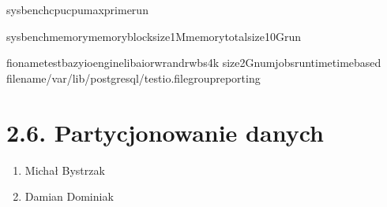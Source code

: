 \documentclass[a4paper,11pt,english,openany,oneside]{sphinxmanual}
\begin{document}
\begin{sphinxVerbatim}[commandchars=\\\{\}]
sysbenchcpu\PYGZhy{}\PYGZhy{}cpu\PYGZhy{}max\PYGZhy{}primerun

sysbenchmemory\PYGZhy{}\PYGZhy{}memory\PYGZhy{}block\PYGZhy{}size1M\PYGZhy{}\PYGZhy{}memory\PYGZhy{}total\PYGZhy{}size10Grun

fio\PYGZhy{}\PYGZhy{}nametest\PYGZus{}bazy\PYGZhy{}\PYGZhy{}ioenginelibaio\PYGZhy{}\PYGZhy{}rwrandrw\PYGZhy{}\PYGZhy{}bs4k
\PYGZhy{}\PYGZhy{}size2G\PYGZhy{}\PYGZhy{}numjobs\PYGZhy{}\PYGZhy{}runtime\PYGZhy{}\PYGZhy{}time\PYGZus{}based
\PYGZhy{}\PYGZhy{}filename/var/lib/postgresql/test\PYGZus{}io.file\PYGZhy{}\PYGZhy{}group\PYGZus{}reporting
\end{sphinxVerbatim}

\sphinxstepscope


\section{2.6. Partycjonowanie danych}
\label{\detokenize{rozdzial_2/rozdzial_26/index:partycjonowanie-danych}}\label{\detokenize{rozdzial_2/rozdzial_26/index::doc}}
\sphinxAtStartPar
{}
\begin{enumerate}
%
\item {} 
\sphinxAtStartPar
Michał Bystrzak

\item {} 
\sphinxAtStartPar
Damian Dominiak

\end{enumerate}
\end{document}
